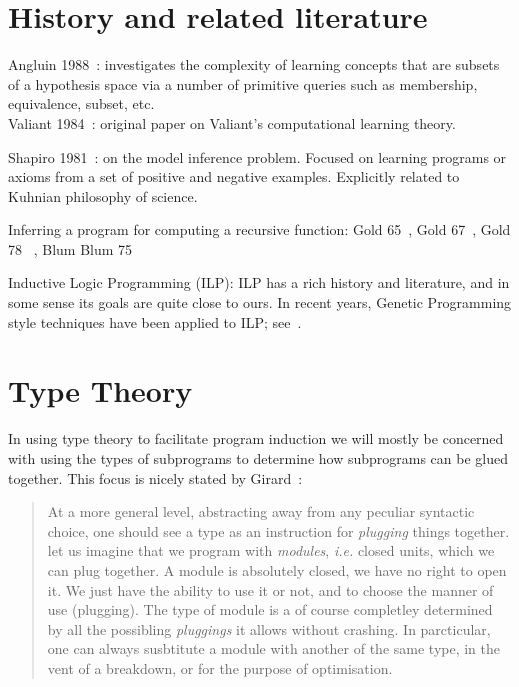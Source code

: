 \documentclass{article}
\begin{document}
\section{History and related literature}
Angluin 1988~\cite{angluin1988queries}: investigates the complexity of
learning concepts that are subsets of a hypothesis space via a number
of primitive queries such as membership, equivalence, subset, etc. \\

Valiant 1984~\cite{valiant1984theory}: original paper on Valiant's
computational learning theory.

Shapiro 1981~\cite{shapiro1981algorithm}: on the model inference
problem. Focused on learning programs or axioms from a set of positive
and negative examples. Explicitly related to Kuhnian philosophy of
science.

Inferring a program for computing a recursive function: 
Gold 65~\cite{gold1965limiting}, 
Gold 67~\cite{gold1967language},
Gold 78 ~\cite{gold1978complexity},
Blum  Blum 75~\cite{blum1975toward}

Inductive Logic Programming (ILP): ILP has a rich history and
literature, and in some sense its goals are quite close to ours. In
recent years, Genetic Programming style techniques have been applied
to ILP; see~\cite{divina2006evolutionary}.

\section{Type Theory}
In using type theory to facilitate program induction we will mostly be
concerned with using the types of subprograms to determine how
subprograms can be glued together. This focus is nicely stated by Girard~\cite{girard1989proofs}:

\begin{quote}
At a more general level, abstracting away from any peculiar syntactic
choice, one should see a type as an instruction for \emph{plugging}
things together. let us imagine that we program with \emph{modules},
\emph{i.e.} closed units, which we can plug together. A module is
absolutely closed, we have no right to open it. We just have the
ability to use it or not, and to choose the manner of use
(plugging). The type of module is a of course completley determined by
all the possibling \emph{pluggings} it allows without crashing. In
parcticular, one can always susbtitute a module with another of the
same type, in the vent of a breakdown, or for the purpose of
optimisation.
\end{quote}
\end{document}
